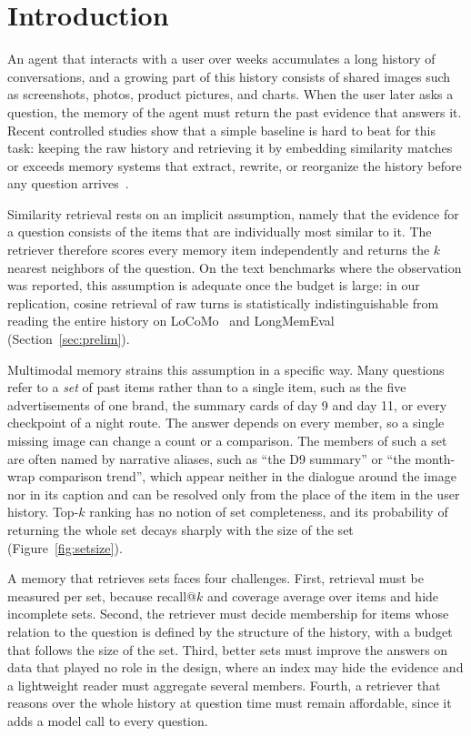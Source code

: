 \section{Introduction}
\label{sec:intro}

An agent that interacts with a user over weeks accumulates a long history of conversations, and a growing part of this history consists of shared images such as screenshots, photos, product pictures, and charts. When the user later asks a question, the memory of the agent must return the past evidence that answers it. Recent controlled studies show that a simple baseline is hard to beat for this task: keeping the raw history and retrieving it by embedding similarity matches or exceeds memory systems that extract, rewrite, or reorganize the history before any question arrives~\citep{bao2026rawrag,zhou2026explicit,sharma2026selection,peng2026memorytax}.

Similarity retrieval rests on an implicit assumption, namely that the evidence for a question consists of the items that are individually most similar to it. The retriever therefore scores every memory item independently and returns the $k$ nearest neighbors of the question. On the text benchmarks where the observation was reported, this assumption is adequate once the budget is large: in our replication, cosine retrieval of raw turns is statistically indistinguishable from reading the entire history on LoCoMo~\citep{maharana2024locomo} and LongMemEval~\citep{wu2025longmemeval} (Section~\ref{sec:prelim}).

Multimodal memory strains this assumption in a specific way. Many questions refer to a \emph{set} of past items rather than to a single item, such as the five advertisements of one brand, the summary cards of day 9 and day 11, or every checkpoint of a night route. The answer depends on every member, so a single missing image can change a count or a comparison. The members of such a set are often named by narrative aliases, such as ``the D9 summary'' or ``the month-wrap comparison trend'', which appear neither in the dialogue around the image nor in its caption and can be resolved only from the place of the item in the user history. Top-$k$ ranking has no notion of set completeness, and its probability of returning the whole set decays sharply with the size of the set (Figure~\ref{fig:setsize}).

A memory that retrieves sets faces four challenges. First, retrieval must be measured per set, because recall@$k$ and coverage average over items and hide incomplete sets. Second, the retriever must decide membership for items whose relation to the question is defined by the structure of the history, with a budget that follows the size of the set. Third, better sets must improve the answers on data that played no role in the design, where an index may hide the evidence and a lightweight reader must aggregate several members. Fourth, a retriever that reasons over the whole history at question time must remain affordable, since it adds a model call to every question.

